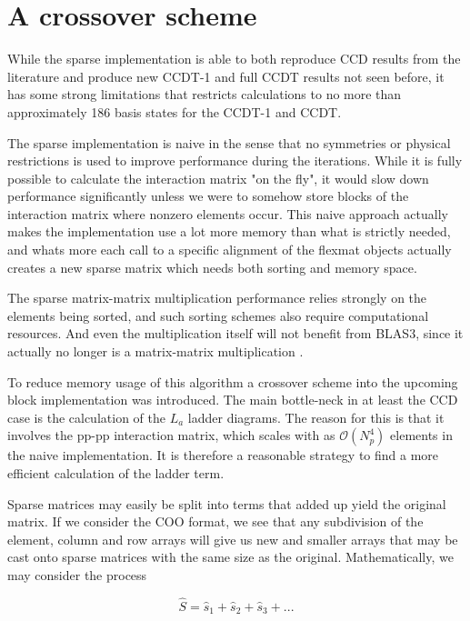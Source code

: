 \FloatBarrier

\section{A crossover scheme}

While the sparse implementation is able to both reproduce CCD results from the literature and produce new CCDT-1 and full CCDT results not seen before, it has some strong limitations that restricts calculations to no more than approximately 186 basis states for the CCDT-1 and CCDT.

The sparse implementation is naive in the sense that no symmetries or physical restrictions is used to improve performance during the iterations. While it is fully possible to calculate the interaction matrix "on the fly", it would slow down performance significantly unless we were to somehow store blocks of the interaction matrix where nonzero elements occur. This naive approach actually makes the implementation use a lot more memory than what is strictly needed, and whats more each call to a specific alignment of the flexmat objects actually creates a new sparse matrix which needs both sorting and memory space. 

The sparse matrix-matrix multiplication performance relies strongly on the elements being sorted, and such sorting schemes also require computational resources. And even the multiplication itself will not benefit from BLAS3, since it actually no longer is a matrix-matrix multiplication \cite{Karniadakis}.

To reduce memory usage of this algorithm a crossover scheme into the upcoming block implementation was introduced. The main bottle-neck in at least the CCD case is the calculation of the $L_a$ ladder diagrams. The reason for this is that it involves the pp-pp interaction matrix, which scales with as $\mathcal{O}(N_p^4)$ elements in the naive implementation. It is therefore a reasonable strategy to find a more efficient calculation of the ladder term.

Sparse matrices may easily be split into terms that added up yield the original matrix. If we consider the COO format, we see that any subdivision of the element, column and row arrays will give us new and smaller arrays that may be cast onto sparse matrices with the same size as the original. Mathematically, we may consider the process

\begin{equation}
\hat{S} = \hat{s}_1 + \hat{s}_2 + \hat{s}_3 + ...
\end{equation}

